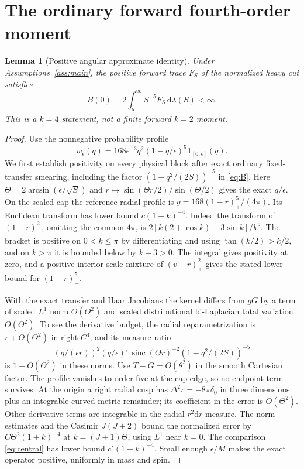 \documentclass[11pt,a4paper]{article}
\newtheorem{lemma}[theorem]{Lemma}
\theoremstyle{definition}
\theoremstyle{remark}
\newcommand{\dS}{\mathrm{d}}
\newcommand{\sinc}{\operatorname{sinc}}
\begin{document}
\section{The ordinary forward fourth-order moment}\label{sec:tauberian}
\begin{lemma}[Positive angular approximate identity]\label{lem:tauberian}
Under Assumptions~\ref{ass:main}, the positive forward trace $F_S$ of the normalized heavy cut satisfies
\begin{equation}\label{eq:forward}
       B(0)=2\int_\mu^\infty S^{-5} F_S\,\dS\lambda(S)<\infty .
\end{equation}
This is a $k=4$ statement, not a finite forward $k=2$ moment.
\end{lemma}
\begin{proof}
Use the nonnegative probability profile
\[
 w_\epsilon(q)=168\epsilon^{-3}q^2(1-q/\epsilon)^5
 \mathbf1_{[0,\epsilon]}(q).
\]
We first establish positivity on every physical block after exact ordinary fixed-transfer smearing, including the factor $(1-q^2/(2S))^{-5}$ in \eqref{eq:B}. Here
$\Theta=2\arcsin(\epsilon/\sqrt S)$ and
$r\mapsto \sin(\Theta r/2)/\sin(\Theta/2)$ gives the exact $q/\epsilon$. On the scaled cap the reference radial profile is $g=168(1-r)_+^5/(4\pi)$. Its Euclidean transform has lower bound $c(1+k)^{-4}$. Indeed the transform of $(1-r)_+^2$, omitting the common $4\pi$, is
$2[k(2+\cos k)-3\sin k]/k^5$. The bracket is positive on $0<k\le\pi$ by differentiating and using $\tan(k/2)>k/2$, and on $k>\pi$ it is bounded below by $k-3>0$. The integral gives positivity at zero, and a positive interior scale mixture of $(v-r)_+^2$ gives the stated lower bound for $(1-r)_+^5$.

With the exact transfer and Haar Jacobians the kernel differs from $gG$ by a term of scaled $L^1$ norm $O(\Theta^2)$ and scaled distributional bi-Laplacian total variation $O(\Theta^2)$. To see the derivative budget, the radial reparametrization is $r+O(\Theta^2)$ in right $C^4$, and its measure ratio
\[
 (q/(\epsilon r))^2 (q/\epsilon)'\,\sinc(\Theta r)^{-2}
                      (1-q^2/(2S))^{-5}
\]
is $1+O(\Theta^2)$ in these norms. Use $T-G=O(\theta^2)$ in the smooth Cartesian factor. The profile vanishes to order five at the cap edge, so no endpoint term survives. At the origin a right radial cusp has $\Delta^2r=-8\pi\delta_0$ in three dimensions plus an integrable curved-metric remainder; its coefficient in the error is $O(\Theta^2)$. Other derivative terms are integrable in the radial $r^2\dS r$ measure. The norm estimates and the Casimir $J(J+2)$ bound the normalized error by $C\Theta^2(1+k)^{-4}$ at $k=(J+1)\Theta$, using $L^1$ near $k=0$. The comparison \eqref{eq:central} has lower bound $c'(1+k)^{-4}$. Small enough $\epsilon/M$ makes the exact operator positive, uniformly in mass and spin.


\end{proof}
\end{document}

